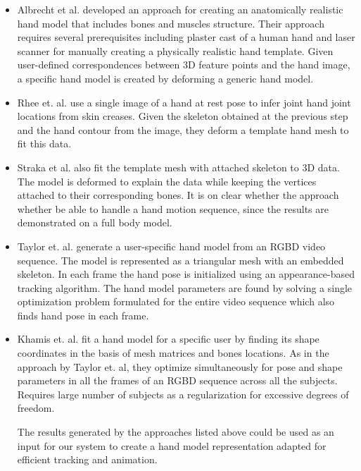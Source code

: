 \begin{itemize}

\item Albrecht et al. \cite{albrecht2003construction} developed an approach for creating an anatomically realistic hand model that includes bones and muscles structure. Their approach requires several prerequisites including plaster cast of a human hand and laser scanner for manually creating a physically realistic hand template. Given user-defined correspondences between 3D feature points and the hand image, a specific hand model is created by deforming a generic hand model. 

\item Rhee et. al. \cite{rhee2006human} use a single image of a hand at rest pose to infer joint hand joint locations from skin creases. Given the skeleton obtained at the previous step and the hand contour from the image, they deform a template hand mesh to fit this data. 

\item Straka et al. \cite{straka2012simultaneous} also fit the template mesh with attached skeleton to 3D data. The model is deformed to explain the data while keeping the vertices attached to their corresponding bones. It is on clear whether the approach whether be able to handle a hand motion sequence, since the results are demonstrated on a full body model.

\item Taylor et. al. \cite{taylor2014user} generate a user-specific hand model from an RGBD video sequence. The model is represented as a triangular mesh with an embedded skeleton. In each frame the hand pose is initialized using an appearance-based tracking algorithm. The hand model parameters are found by solving a single optimization problem formulated for the entire video sequence which also finds hand pose in each frame. 

\item Khamis et. al.  \cite{khamis12learning} fit a hand model for a specific user by finding its shape coordinates in the basis of mesh matrices and bones locations. As in the approach by Taylor et. al, they optimize simultaneously for pose and shape parameters in all the frames of an RGBD sequence across all the subjects. Requires large number of subjects as a regularization for excessive degrees of freedom. 

The results generated by the approaches listed above could be used as an input for our system to create a hand model representation adapted for efficient tracking and animation.


\end{itemize}